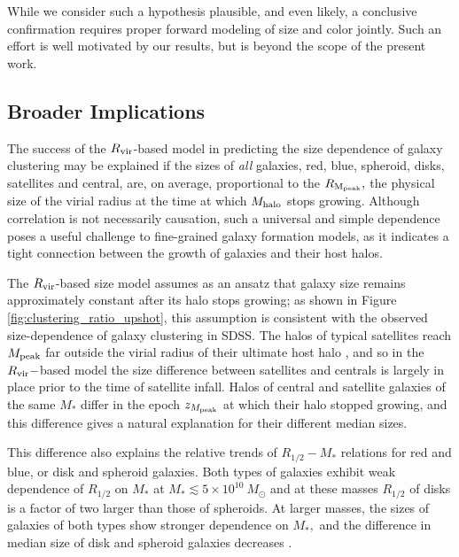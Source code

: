 \documentclass[usenatbib,usegraphicx,letterpaper]{mn2e}
\newcommand{\rhalf}{R_{1/2}}
\newcommand{\mstar}{M_{\ast}}
\newcommand{\mpeak}{M_{\rm peak}}
\newcommand{\zpeak}{z_{M_{\rm peak}}}
\newcommand{\mhalo}{M_{\rm halo}}
\newcommand{\rvir}{R_{\rm vir}}
\newcommand{\rmpeak}{R_{\rm M_{peak}}}
\begin{document}
While we consider such a hypothesis plausible, and even likely, a conclusive confirmation requires proper forward modeling of size and color jointly. Such an effort is well motivated by our results, but is beyond the scope of the present work.

\subsection{Broader Implications}
\label{subsec:broader_implications}

The success of the $\rvir$-based model in predicting the size dependence of galaxy clustering may be explained if the sizes of {\it all} galaxies, red, blue, spheroid, disks, satellites and central, are, on average, proportional to the $\rmpeak,$ the physical size of the virial radius at the time at which $\mhalo$ stops growing. Although correlation is not necessarily causation, such a universal and simple dependence poses a useful challenge to fine-grained galaxy formation models, as it indicates a tight connection between the growth of galaxies and their host halos.

The $\rvir$-based size model assumes as an ansatz that galaxy size remains approximately constant after its halo stops growing; as shown in Figure \ref{fig:clustering_ratio_upshot}, this assumption is consistent with the observed size-dependence of galaxy clustering in SDSS.  The halos of typical satellites reach $\mpeak$ far outside the virial radius of their ultimate host halo \citep{behroozi_etal14}, and so in the $\rvir-$based model the size difference between satellites and centrals is largely in place prior to the time of satellite infall. Halos of central and satellite galaxies of the same $\mstar$ differ in the epoch $\zpeak$ at which their halo stopped growing, and this difference gives a natural explanation for their different median sizes.

This difference also explains the relative trends of $\rhalf-\mstar$ relations for red and blue, or disk and spheroid galaxies.
Both types of galaxies exhibit weak dependence of $\rhalf$ on $\mstar$ at $\mstar\lesssim 5\times 10^{10}\ M_\odot$ and
at these masses $\rhalf$ of disks is a factor of two larger than those of spheroids. At larger masses, the sizes of galaxies of both types show stronger dependence on $\mstar,$ and the difference in median size of disk and spheroid galaxies decreases \citep[e.g.,][]{bernardi_etal14}.
\end{document}
